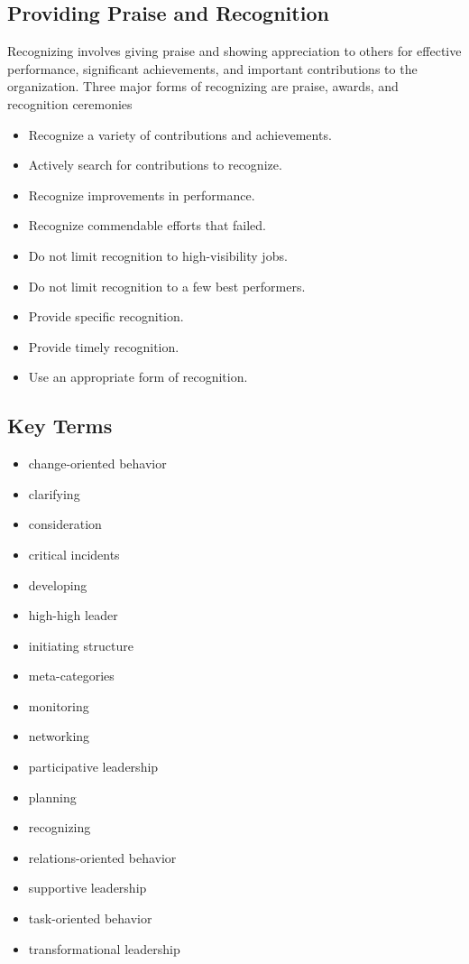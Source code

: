 \subsection{Providing Praise and Recognition} %
\label{ssub:providing_praise_and_recognition}
Recognizing involves giving praise and showing appreciation to others for effective performance, significant achievements, and important contributions to the organization.
Three major forms of recognizing are praise, awards, and recognition ceremonies

\begin{itemize}
	\item Recognize a variety of contributions and achievements.
	\item Actively search for contributions to recognize.
	\item Recognize improvements in performance.
	\item Recognize commendable efforts that failed.
	\item Do not limit recognition to high-visibility jobs.
	\item Do not limit recognition to a few best performers.
	\item Provide specific recognition.
	\item Provide timely recognition.
	\item Use an appropriate form of recognition.
\end{itemize}


\subsection{Key Terms} %
\label{ssub:key_terms}
\begin{itemize}
	\item change-oriented behavior
	\item clarifying
	\item consideration
	\item critical incidents
	\item developing
	\item high-high leader
	\item initiating structure
	\item meta-categories
	\item monitoring
	\item networking
	\item participative leadership
	\item planning
	\item recognizing
	\item relations-oriented behavior
	\item supportive leadership
	\item task-oriented behavior
	\item transformational leadership
\end{itemize}



